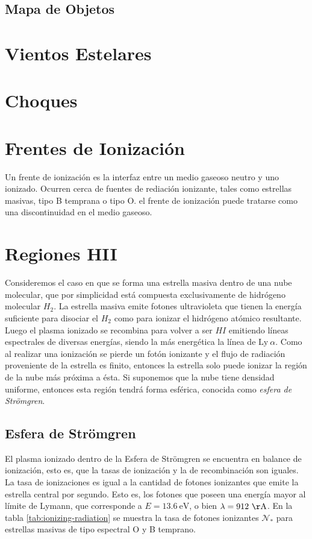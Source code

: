 \subsection{Mapa de Objetos}
\section{Vientos Estelares}
\section{Choques}
\section{Frentes de Ionización}
Un frente de ionización es la interfaz entre un medio gaseoso neutro y uno
ionizado. Ocurren cerca de fuentes de rediación ionizante, tales como
estrellas masivas, tipo B temprana o tipo O. el frente de ionización puede
tratarse como una discontinuidad en el medio gaseoso.

\section{Regiones HII \citep{Stahler:2004}}
\label{sec:HII}
\newcommand\Nio{\ensuremath{\mathcal{N}}}

Consideremos el caso en que se forma una estrella masiva dentro de una nube molecular, que por simplicidad está compuesta exclusivamente de hidrógeno molecular $H_2$. La estrella masiva emite fotones ultravioleta que tienen la energía suficiente para disociar el $H_2$  como para ionizar el hidrógeno atómico resultante. Luego el plasma ionizado se recombina para volver a ser $HI$ emitiendo líneas espectrales de diversas energías, siendo la más energética la línea de $\mathrm{Ly~}\alpha$. Como al realizar una ionización se pierde un fotón ionizante y el flujo de radiación proveniente de la estrella es finito, entonces la estrella solo puede ionizar la región de la nube más próxima a ésta. Si suponemos que la nube tiene densidad uniforme, entonces esta región tendrá forma esférica, conocida como \textit{esfera de Strömgren}.

\subsection{Esfera de Strömgren}

El plasma ionizado dentro de la Esfera de Strömgren se encuentra en balance de ionización, esto es, que la tasas de ionización y la de recombinación son iguales. La tasa de ionizaciones es igual a la cantidad de fotones ionizantes que emite la estrella central por segundo. Esto es, los fotones que poseen una energía mayor al límite de Lymann, que corresponde a  $E = 13.6\mathrm{~eV}$, o bien $\lambda = 912\mathrm{~\AA}$. En la tabla \ref{tab:ionizing-radiation} se muestra la tasa de fotones ionizantes $\Nio_*$ para estrellas masivas de tipo espectral O y B temprano.

